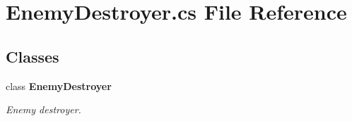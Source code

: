 \section{Enemy\+Destroyer.\+cs File Reference}
\label{_enemy_destroyer_8cs}
\subsection*{Classes}
\begin{DoxyCompactItemize}
\item 
class {\bf Enemy\+Destroyer}
\begin{DoxyCompactList}\small\item\em Enemy destroyer. \end{DoxyCompactList}\end{DoxyCompactItemize}
